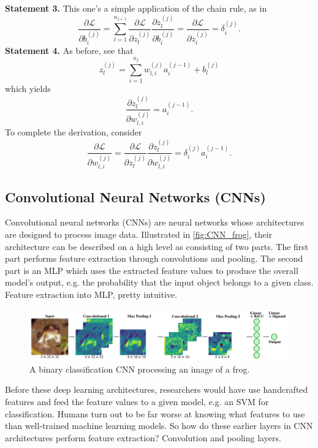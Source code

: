 \documentclass[11pt]{article}
\begin{document}
\vspace{10pt}
\noindent\textbf{Statement 3.} This one's a simple application of the chain rule, as in
$$
\frac{\partial\mathcal{L}}{\partial b_i^{(j)}}
=
\sum_{l=1}^{n_{j+1}}\frac{\partial\mathcal{L}}{\partial z_l^{(j)}}\frac{\partial z_l^{(j)}}{\partial b_i^{(j)}}
=
\frac{\partial\mathcal{L}}{\partial z_i^{(j)}}
=
\delta_i^{(j)}.
$$
\textbf{Statement 4.} As before, see that
$$
z_l^{(j)}
=
\sum_{i=1}^{n_j}w_{l,i}^{(j)}a_i^{(j-1)}+b_l^{(j)}
$$
which yields
$$
\frac{\partial z_l^{(j)}}{\partial w_{l,i}^{(j)}}
=
a_i^{(j-1)}.
$$
To complete the derivation, consider
$$
\frac{\partial\mathcal{L}}{\partial w_{l,i}^{(j)}}
=
\frac{\partial\mathcal{L}}{\partial z_l^{(j)}}\frac{\partial z_l^{(j)}}{\partial w_{l,i}^{(j)}}
=
\delta_i^{(j)}a_i^{(j-1)}.
$$

\subsection{Convolutional Neural Networks (CNNs)}
\label{subsec:conv_neural_networks}
Convolutional neural networks (CNNs) are neural networks whose architectures are designed to process image data. Illustrated in \autoref{fig:CNN_frog}, their architecture can be described on a high level as consisting of two parts. The first part performs feature extraction through convolutions and pooling. The second part is an MLP which uses the extracted feature values to produce the overall model's output, e.g. the probability that the input object belongs to a given class. Feature extraction into MLP, pretty intuitive.

\begin{figure}[t]
    \centering
    \includegraphics[width=1\textwidth]{./figures/neural_nets/CNN_frog.pdf}
    \caption{A binary classification CNN processing an image of a frog.}
    \label{fig:CNN_frog}
\end{figure}

Before these deep learning architectures, researchers would have use handcrafted features and feed the feature values to a given model, e.g. an SVM for classification. Humans turn out to be far worse at knowing what features to use than well-trained machine learning models. So how do these earlier layers in CNN architectures perform feature extraction? Convolution and pooling layers. 
\end{document}
